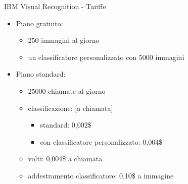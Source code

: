 %
\begin{frame}[t]{IBM Visual Recognition - Tariffe}
\begin{itemize}
	\item Piano gratuito:
	\begin{itemize}
		\item 250 immagini al giorno
		\item un classificatore personalizzato con 5000 immagini
	\end{itemize}
	\item Piano standard:
	\begin{itemize}
		\item 25000 chiamate al giorno
		\item classificazione: [a chiamata]
		\begin{itemize}
			\item standard: 0,002\$
			\item con classificatore personalizzato: 0,004\$
		\end{itemize}
		\item volti: 0,004\$ a chiamata
		\item addestramento classificatore: 0,10\$ a immagine
	\end{itemize}
\end{itemize}
\end{frame}
%
